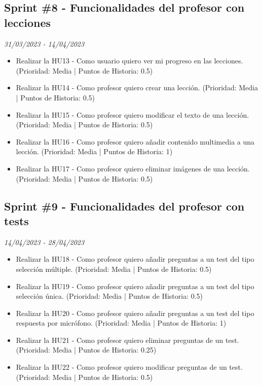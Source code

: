 \subsection{Sprint \#8 - Funcionalidades del profesor con lecciones}
\textit{31/03/2023   -   14/04/2023}
\begin{itemize}

\item Realizar la HU13 - Como usuario quiero ver mi progreso en las lecciones. (Prioridad: Media | Puntos de Historia: 0.5)
\item Realizar la HU14 - Como profesor quiero crear una lección. (Prioridad: Media | Puntos de Historia: 0.5)
\item Realizar la HU15 - Como profesor quiero modificar el texto de una lección. (Prioridad: Media | Puntos de Historia: 0.5)
\item Realizar la HU16 - Como profesor quiero añadir contenido multimedia a una lección. (Prioridad: Media | Puntos de Historia: 1)
\item Realizar la HU17 - Como profesor quiero eliminar imágenes de una lección. (Prioridad: Media | Puntos de Historia: 0.5)
\end{itemize}

\subsection{Sprint \#9 - Funcionalidades del profesor con tests}
\textit{14/04/2023   -   28/04/2023}
\begin{itemize}

\item Realizar la HU18 - Como profesor quiero añadir preguntas a un test del tipo selección múltiple. (Prioridad: Media | Puntos de Historia: 0.5)
\item Realizar la HU19 - Como profesor quiero añadir preguntas a un test del tipo selección única. (Prioridad: Media | Puntos de Historia: 0.5)
\item Realizar la HU20 - Como profesor quiero añadir preguntas a un test del tipo respuesta por micrófono. (Prioridad: Media | Puntos de Historia: 1)
\item Realizar la HU21 - Como profesor quiero eliminar preguntas de un test. (Prioridad: Media | Puntos de Historia: 0.25)
\item Realizar la HU22 - Como profesor quiero modificar preguntas de un test. (Prioridad: Media | Puntos de Historia: 0.5)
\end{itemize}

